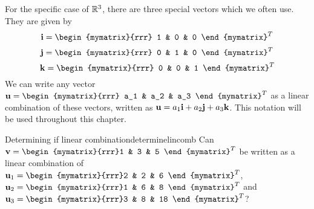 For the specific case of $\mathbb{R}^3$, there are three special vectors which we often use. 
They are given by 
\begin{equation*}
\vect{i} = 
\begin{mymatrix}{rrr}
1 & 0 & 0
\end{mymatrix}^T
\end{equation*}
\begin{equation*}
\vect{j} = 
\begin{mymatrix}{rrr}
0 & 1 & 0
\end{mymatrix}^T
\end{equation*}
\begin{equation*}
\vect{k} = 
\begin{mymatrix}{rrr}
0 & 0 & 1
\end{mymatrix}^T
\end{equation*}
We can write any vector $\vect{u} = 
\begin{mymatrix}{rrr}
a_1 & a_2 & a_3
\end{mymatrix}^T$
as a linear combination of these vectors, written as ${\bf u} = a_1 {\bf i} + a_2 {\bf j} + a_3 {\bf k}$. This notation will be used throughout 
this chapter.

\begin{example}{Determining if linear combination}{determinelincomb}
Can $\vect{v}=\begin{mymatrix}{rrr}1 & 3 & 5 \end{mymatrix}^T$ be written as a linear combination of $\vect{u}_1=\begin{mymatrix}{rrr}2 & 2 & 6 \end{mymatrix}^T$, $\vect{u}_2=\begin{mymatrix}{rrr}1 & 6 & 8 \end{mymatrix}^T$ and $\vect{u}_3=\begin{mymatrix}{rrr}3 & 8 & 18 \end{mymatrix}^T$?
\end{example}

